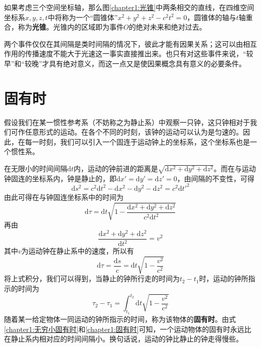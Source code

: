 如果考虑三个空间坐标轴，那么图\ref{chapter1:光锥}中两条相交的直线，在四维空间坐标系$x,y,z,t$中将称为一个“圆锥体”$x^2+y^2+z^2-c^2t^2 = 0$，圆锥体的轴与$t$轴重合，称为{\bf 光锥}。光锥内的区域即为事件$O$的绝对未来和绝对过去。

两个事件仅仅在其间隔是类时间隔的情况下，彼此才能有因果关系；这可以由相互作用的传播速度不能大于光速这一事实直接推出来。也只有对这些事件来说，“较早”和“较晚”才具有绝对意义，而这一点又是使因果概念具有意义的必要条件。

\section{固有时}

假设我们在某一惯性参考系（不妨称之为静止系）中观察一只钟，这只钟相对于我们可作任意形式的运动。在各个不同的时刻，该钟的运动可以认为是匀速的。因此，在每一时刻，我们可以引入一个固连于运动钟上的坐标系，这个坐标系也是一个惯性系。

在无限小的时间间隔$\mathrm{d}t$内，运动的钟前进的距离是$\sqrt{\mathrm{d}x^2 + \mathrm{d}y^2 + \mathrm{d}z^2}$。而在与运动钟固连的坐标系内，钟是静止的，即$\mathrm{d}x'= \mathrm{d}y' = \mathrm{d}z' = 0$，由间隔的不变性，可得
\begin{equation*}
	\mathrm{d}s^2 = c^2 \mathrm{d}t^2 - \mathrm{d}x^2 - \mathrm{d}y^2 - \mathrm{d}z^2 = c^2 \mathrm{d} t'^2
\end{equation*}
由此可得在与钟固连坐标系中的时间为
\begin{equation*}
	\mathrm{d}\tau = \mathrm{d}t \sqrt{1-\frac{\mathrm{d}x^2 + \mathrm{d}y^2 + \mathrm{d}z^2}{c^2 \mathrm{d}t^2}}
\end{equation*}
再由
\begin{equation*}
	\frac{\mathrm{d}x^2 + \mathrm{d}y^2 + \mathrm{d}z^2}{\mathrm{d}t^2} = v^2
\end{equation*}
其中$v$为运动钟在静止系中的速度，所以有
\begin{equation}
	\mathrm{d}\tau = \frac{\mathrm{d} s}{c} = \mathrm{d}t\sqrt{1-\frac{v^2}{c^2}}
	\label{chapter1:无穷小固有时}
\end{equation}
将上式积分，我们可以得到，当静止的钟所行走的时间为$t_2-t_1$时，运动的钟所指示的时间为
\begin{equation}
	\tau_2 - \tau_1 = \int_{t_1}^{t_2} \mathrm{d}t\sqrt{1-\frac{v^2}{c^2}}
	\label{chapter1:固有时}
\end{equation}
随着某一给定物体一同运动的钟所指示的时间，称为该物体的{\bf 固有时}。由式\eqref{chapter1:无穷小固有时}和\eqref{chapter1:固有时}可知，一个运动物体的固有时永远比在静止系内相对应的时间间隔小。换句话说，运动的钟比静止的钟走得慢些。

